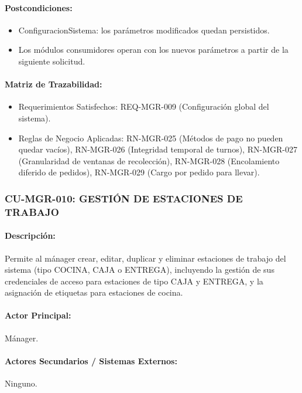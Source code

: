 \paragraph{Postcondiciones:}
\begin{itemize}
    \item ConfiguracionSistema: los parámetros modificados quedan persistidos.
    \item Los módulos consumidores operan con los nuevos parámetros a partir de la siguiente solicitud.
\end{itemize}

\paragraph{Matriz de Trazabilidad:}
\begin{itemize}
    \item Requerimientos Satisfechos: REQ-MGR-009 (Configuración global del sistema).
    \item Reglas de Negocio Aplicadas: RN-MGR-025 (Métodos de pago no pueden quedar vacíos), RN-MGR-026 (Integridad temporal de turnos), RN-MGR-027 (Granularidad de ventanas de recolección), RN-MGR-028 (Encolamiento diferido de pedidos), RN-MGR-029 (Cargo por pedido para llevar).
\end{itemize}

\subsubsection{CU-MGR-010: GESTIÓN DE ESTACIONES DE TRABAJO}
\paragraph{Descripción:} Permite al mánager crear, editar, duplicar y eliminar estaciones de trabajo del sistema (tipo COCINA, CAJA o ENTREGA), incluyendo la gestión de sus credenciales de acceso para estaciones de tipo CAJA y ENTREGA, y la asignación de etiquetas para estaciones de cocina.

\paragraph{Actor Principal:} Mánager.

\paragraph{Actores Secundarios / Sistemas Externos:} Ninguno.

